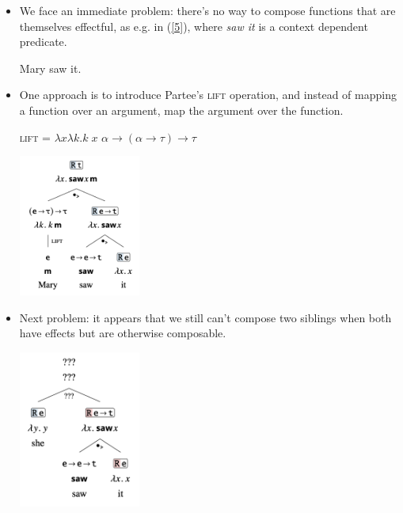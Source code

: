 \documentclass{article}
\begin{document}
\begin{itemize}
  \item We face an immediate problem: there's no way to compose functions that are themselves effectful, as e.g. in (\ref{5}),
    where \textit{saw it} is a context dependent predicate.
    \begin{exe}
      \ex \label{5} Mary saw it.
    \end{exe}
  \item One approach is to introduce Partee's \textsc{lift} operation, and instead of mapping a function
    over an argument, map the argument over the function.
  \begin{exe}
    \ex \textsc{lift} = $\lambda x\lambda k. k \; x$ \hfill $\alpha \to (\alpha \to \tau) \to \tau$
    \ex \hfill \begin{center}
      \includegraphics[width=4cm]{clips/9.png}
    \end{center}
  \end{exe}
\end{itemize}

\begin{itemize}
  \item Next problem: it appears that we still can't compose two siblings when both have effects but are otherwise composable.
  \begin{exe}
    \ex \label{9} \hfill
      \begin{center}
        \includegraphics[width=4cm]{clips/10.png}
      \end{center}
  \end{exe}
\end{itemize}
\end{document}
